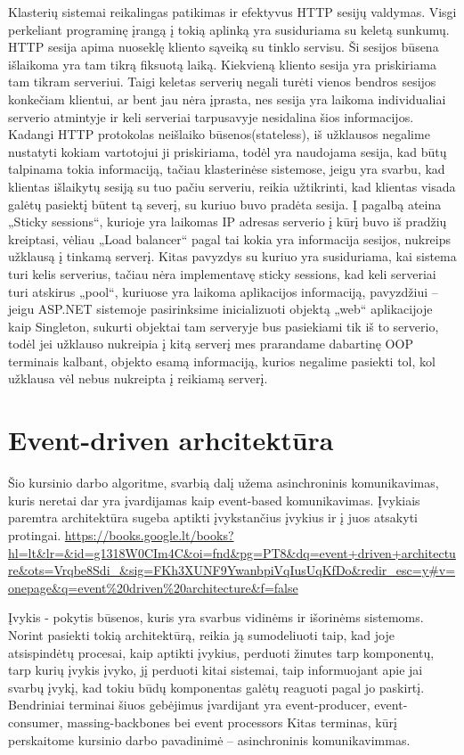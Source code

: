 \documentclass{VUMIFPSkursinis}
\begin{document}
Klasterių sistemai reikalingas patikimas ir efektyvus HTTP sesijų valdymas. Visgi perkeliant programinę įrangą į tokią aplinką yra susiduriama su keletą sunkumų. HTTP sesija apima nuoseklę kliento sąveiką su tinklo servisu. Ši sesijos būsena išlaikoma yra tam tikrą fiksuotą laiką. Kiekvieną kliento sesija yra priskiriama tam tikram serveriui. Taigi keletas serverių negali turėti vienos bendros sesijos konkečiam klientui, ar bent jau nėra įprasta, nes sesija yra laikoma individualiai serverio atmintyje ir keli serveriai tarpusavyje nesidalina šios informacijos. Kadangi HTTP protokolas neišlaiko būsenos(stateless), iš užklausos negalime nustatyti kokiam vartotojui ji priskiriama, todėl yra naudojama sesija, kad būtų talpinama tokia informaciją, tačiau klasterinėse sistemose, jeigu yra svarbu, kad klientas išlaikytų sesiją su tuo pačiu serveriu, reikia užtikrinti, kad klientas visada galėtų pasiektį būtent tą severį, su kuriuo buvo pradėta sesija. Į pagalbą ateina „Sticky sessions“, kurioje yra laikomas IP adresas serverio į kūrį buvo iš pradžių kreiptasi, vėliau „Load balancer“ pagal tai kokia yra informacija sesijos, nukreips užklausą į tinkamą serverį. Kitas pavyzdys su kuriuo yra susiduriama, kai sistema turi kelis serverius, tačiau nėra implementavę sticky sessions, kad keli serveriai turi atskirus „pool“, kuriuose yra laikoma aplikacijos informaciją, pavyzdžiui – jeigu ASP.NET sistemoje pasirinksime inicializuoti objektą „web“ aplikacijoje kaip Singleton, sukurti objektai tam serveryje bus pasiekiami tik iš to serverio, todėl jei užklauso nukreipia į kitą serverį mes prarandame dabartinę OOP terminais kalbant, objekto esamą informaciją, kurios negalime pasiekti tol, kol užklausa vėl nebus nukreipta į reikiamą serverį.

\section{Event-driven arhcitektūra}
Šio kursinio darbo algoritme, svarbią dalį užema asinchroninis komunikavimas, kuris neretai dar yra įvardijamas kaip event-based komunikavimas.
Įvykiais paremtra architektūra sugeba aptikti įvykstančius įvykius ir į juos atsakyti protingai. \url{https://books.google.lt/books?hl=lt&lr=&id=g1318W0CIm4C&oi=fnd&pg=PT8&dq=event+driven+architecture&ots=Vrqbe8Sdi_&sig=FKh3XUNF9YwanbpiVqIusUqKfDo&redir_esc=y#v=onepage&q=event%20driven%20architecture&f=false}

Įvykis - pokytis būsenos, kuris yra svarbus vidinėms ir išorinėms sistemoms. Norint pasiekti tokią architektūrą, reikia ją sumodeliuoti taip, kad joje atsispindėtų procesai, kaip aptikti įvykius, perduoti žinutes tarp komponentų, tarp kurių įvykis įvyko, jį perduoti kitai sistemai, taip informuojant apie jai svarbų įvykį, kad tokiu būdų komponentas galėtų reaguoti pagal jo paskirtį. Bendriniai terminai šiuos gebėjimus įvardijant yra event-producer, event-consumer, massing-backbones bei event processors
Kitas terminas, kūrį perskaitome kursinio darbo pavadinimė – asinchroninis komunikavimmas. 
\end{document}
